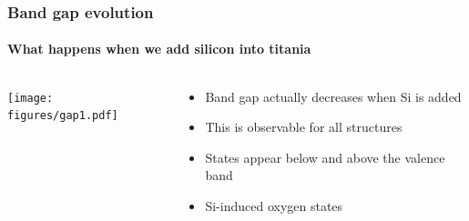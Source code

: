\documentclass[noamsthm,8pt,t]{beamer}
\begin{document}
\begin{frame}
   \frametitle{Band gap evolution}
   \framesubtitle{What happens when we add silicon into titania}

   \begin{columns}
      \begin{column}{0.5\textwidth}
         \begin{center}
            \texttt{[image: figures/gap1.pdf]}
         \end{center}
      \end{column}
      \begin{column}{0.5\textwidth}
         \begin{itemize}
            \item Band gap actually decreases when Si is added
            \item This is observable for all structures
            \item<2-> States appear below and above the valence band
            \item<3> Si-induced oxygen states
         \end{itemize}
         \begin{center}
         \end{center}
      \end{column}
   \end{columns}
\end{frame}
\end{document}
